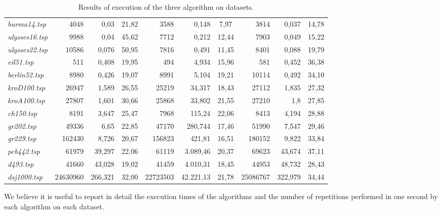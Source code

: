 \begin{landscape}
\begin{table}
\begin{tabular}{|l|r|r|c|r|r|c|r|r|c|}
    \textit{burma14.tsp}	& 4048	    & 0,03	    & 21,82 	& 3588	    & 0,148	    & 7,97      & 3814	    & 0,037	    & 14,78 \\
    \textit{ulysses16.tsp}	& 9988	    & 0,04	    & 45,62 	& 7712	    & 0,212	    & 12,44 	& 7903	    & 0,049	    & 15,22 \\
    \textit{ulysses22.tsp}	& 10586	    & 0,076	    & 50,95     & 7816	    & 0,491	    & 11,45     & 8401	    & 0,088	    & 19,79 \\
    \textit{eil51.tsp}	    & 511	    & 0,408	    & 19,95 	& 494	    & 4,934	    & 15,96 	& 581	    & 0,452	    & 36,38 \\
    \textit{berlin52.tsp}	& 8980	    & 0,426	    & 19,07 	& 8991	    & 5,104	    & 19,21 	& 10114	    & 0,492	    & 34,10 \\
    \textit{kroD100.tsp}    & 26947	    & 1,589	    & 26,55 	& 25219	    & 34,317	& 18,43 	& 27112	    & 1,835	    & 27,32 \\    
    \textit{kroA100.tsp}	& 27807	    & 1,601	    & 30,66 	& 25868	    & 33,802	& 21,55 	& 27210	    & 1,8       & 27,85 \\
    \textit{ch150.tsp}	    & 8191	    & 3,647	    & 25,47 	& 7968	    & 115,24	& 22,06 	& 8413	    & 4,194 	& 28,88 \\
    \textit{gr202.tsp}	    & 49336	    & 6,65  	& 22,85 	& 47170	    & 280,744	& 17,46 	& 51990	    & 7,547 	& 29,46 \\
    \textit{gr229.tsp}	    & 162430	& 8,726 	& 20,67 	& 156823	& 421,81	& 16,51     & 180152	& 9,822 	& 33,84 \\
    \textit{pcb442.tsp}	    & 61979	    & 39,297	& 22,06 	& 61119	    & 3.089,46	& 20,37 	& 69623	    & 43,674	& 37,11 \\
    \textit{d493.tsp}	    & 41660	    & 43,028	& 19,02 	& 41459	    & 4.010,31	& 18,45 	& 44953	    & 48,732	& 28,43 \\
    \textit{dsj1000.tsp}	& 24630960	& 266,321	& 32,00 	& 22723503	& 42.221,13	& 21,78 	& 25086767	& 322,979	& 34,44 \\

    \hline
    \end{tabular}
    \caption{Results of execution of the three algorithm on datasets.}
\end{table}
\end{landscape}
\noindent
We believe it is useful to report in detail the execution times of the algorithms and the number of repetitions performed in one second by each algorithm on each dataset.
